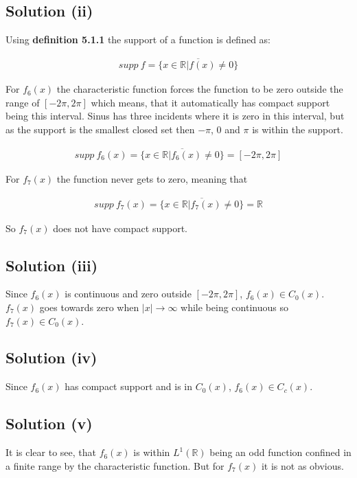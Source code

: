 \documentclass{article}
\begin{document}
\subsection*{Solution (ii)}

Using \textbf{definition 5.1.1} the support of a function is defined as: 

\begin{gather*}
    supp\:f=\overline{\{x \in \mathbb{R} | f(x) \neq 0 \}}
\end{gather*}

For $f_6(x)$ the characteristic function forces the function to be zero outside the range of $[-2\pi,2\pi]$ which means, that it automatically has compact support being this interval. Sinus has three incidents where it is zero in this interval, but as the support is the smallest closed set then $-\pi$, 0 and $\pi$ is within the support.
 
\begin{gather*}
    supp\:f_6(x) = \overline{\{x \in \mathbb{R} | f_6(x) \neq 0 \}}=[-2 \pi,2 \pi]
\end{gather*}

For $f_7(x)$ the function never gets to zero, meaning that

\begin{gather*}
    supp\:f_7(x) = \overline{\{x \in \mathbb{R} | f_7(x) \neq 0 \}}=\mathbb{R}
\end{gather*}

So $f_7(x)$ does not have compact support. 
\subsection*{Solution (iii)}

Since $f_6(x)$ is continuous and zero outside $[-2\pi,2\pi]$, $f_6(x) \in C_0(x)$. $f_7(x)$ goes towards zero when $|x| \rightarrow \infty$ while being continuous so $f_7(x) \in C_0(x)$.

\subsection*{Solution (iv)}

Since $f_6(x)$ has compact support and is in $C_0(x)$, $f_6(x)\in C_c(x)$.

\subsection*{Solution (v)}

It is clear to see, that $f_6(x)$ is within $L^1(\mathbb{R})$ being an odd function confined in a finite range by the characteristic function. But for $f_7(x)$ it is not as obvious. 
\end{document}
